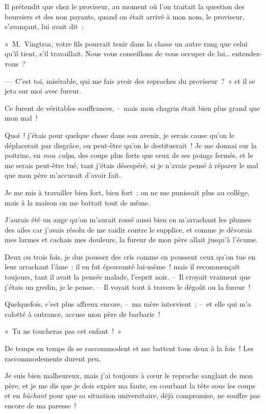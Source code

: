 \documentclass[french,twoside]{book} %
\begin{document}
Il prétendit que chez le proviseur, au moment où l’on traitait la question des boursiers et des non payants, quand on était arrivé à mon nom, le proviseur, s’avançant, lui avait dit :\par
« M. Vingtras, votre fils pourrait tenir dans la classe un autre rang que celui qu’il tient, s’il travaillait. Nous vous conseillons de vous occuper de lui… entendez-vous ?\par
— C’est toi, misérable, qui me fais avoir des reproches du proviseur ? » et il se jeta sur moi avec fureur.\par
Ce furent de véritables souffrances, – mais mon chagrin était bien plus grand que mon mal !\par
Quoi ! j’étais pour quelque chose dans son avenir, je serais cause qu’on le déplacerait par disgrâce, ou peut-être qu’on le destituerait ! Je me donnai sur la poitrine, en \emph{mea culpa}, des coups plus forts que ceux de ses poings fermés, et le me serais peut-être tué, tant j’étais désespéré, si je n’avais pensé à réparer le mal que mon père m’accusait d’avoir fait.\par
Je me mis à travailler bien fort, bien fort ; on ne me punissait plus au collège, mais à la maison on me battait tout de même.\par
J’aurais été un ange qu’on m’aurait rossé aussi bien en m’arrachant les plumes des ailes car j’avais résolu de me raidir contre le supplice, et comme je dévorais mes larmes et cachais mes douleurs, la fureur de mon père allait jusqu’à l’écume.\par
Deux ou trois fois, je dus pousser des cris comme en poussent ceux qu’on tue en leur arrachant l’âme : il en fut épouvanté lui-même ! mais il recommençait toujours, tant il avait la pensée malade, l’esprit noir. – Il croyait vraiment que j’étais un gredin, je le pense. – Il voyait tout à travers le dégoût ou la fureur !\par
Quelquefois, c’est plus affreux encore, – ma mère intervient ; – et elle qui m’a calotté à outrance, accuse mon père de barbarie !\par
« Tu ne toucheras pas cet enfant ! »\par
\bigbreak
\noindent De temps en temps ils se raccommodent et me battent tous deux à la fois ! Les raccommodements durent peu.\par
Je suis bien malheureux, mais j’ai toujours à cœur le reproche sanglant de mon père, et je me dis que je dois expier ma faute, en courbant la tête sous les coups et en \emph{bûchant} pour que sa situation universitaire, déjà compromise, ne souffre pas encore de ma paresse !\par
\end{document}
